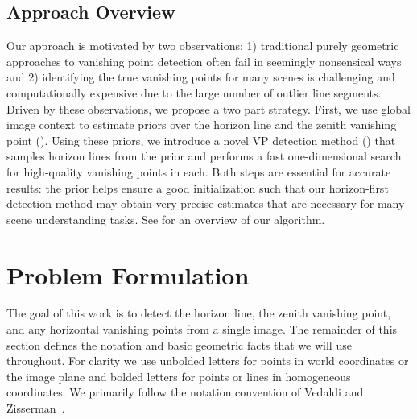 

%
%
\subsection{Approach Overview}

Our approach is motivated by two observations: 1) traditional purely
geometric approaches to vanishing point detection often fail in
seemingly nonsensical ways and 2) identifying the true vanishing
points for many scenes is challenging and computationally expensive
due to the large number of outlier line segments. Driven by these
observations, we propose a two part strategy.  First, we use global
image context to estimate priors over the horizon line and the zenith
vanishing point (). Using these priors, we
introduce a novel VP detection method () that samples
horizon lines from the prior and performs a fast one-dimensional
search for high-quality vanishing points in each. Both steps are
essential for accurate results: the prior helps ensure a good
initialization such that our horizon-first detection method may obtain
very precise estimates that are necessary for many scene understanding
tasks. See  for an overview of our algorithm.

\section{Problem Formulation}
\label{sec:problem}

%

The goal of this work is to detect the horizon line, the zenith
vanishing point, and any horizontal vanishing points from a single
image. The remainder of this section defines the notation and basic
geometric facts that we will use throughout.  For clarity we use
unbolded letters for points in world coordinates or the image plane
and bolded letters for points or lines in homogeneous coordinates.  We
primarily follow the notation convention of Vedaldi and
Zisserman~\cite{selfsketch2012}.

